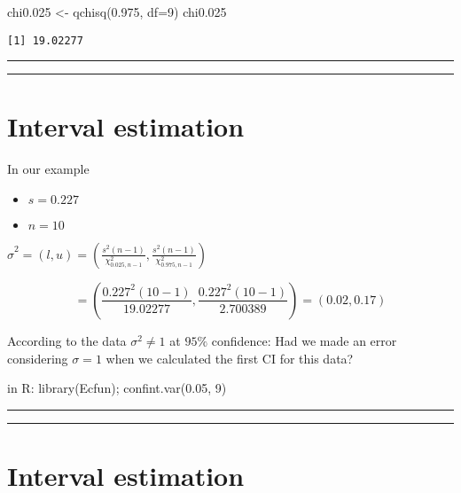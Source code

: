 \documentclass[
]{book}
\newenvironment{Shaded}{\begin{snugshade}}{\end{snugshade}}
\newcommand{\AttributeTok}[1]{\textcolor[rgb]{0.77,0.63,0.00}{#1}}
\newcommand{\DecValTok}[1]{\textcolor[rgb]{0.00,0.00,0.81}{#1}}
\newcommand{\FloatTok}[1]{\textcolor[rgb]{0.00,0.00,0.81}{#1}}
\newcommand{\FunctionTok}[1]{\textcolor[rgb]{0.00,0.00,0.00}{#1}}
\newcommand{\NormalTok}[1]{#1}
\newcommand{\OtherTok}[1]{\textcolor[rgb]{0.56,0.35,0.01}{#1}}
\providecommand{\tightlist}{%
  \setlength{\itemsep}{0pt}\setlength{\parskip}{0pt}}
\begin{document}
\begin{Shaded}
\begin{Highlighting}[]
\NormalTok{chi0}\FloatTok{.025} \OtherTok{\textless{}{-}} \FunctionTok{qchisq}\NormalTok{(}\FloatTok{0.975}\NormalTok{, }\AttributeTok{df=}\DecValTok{9}\NormalTok{)}
\NormalTok{chi0}\FloatTok{.025}
\end{Highlighting}
\end{Shaded}

\begin{verbatim}
[1] 19.02277
\end{verbatim}

\begin{center}\rule{0.5\linewidth}{0.5pt}\end{center}

\begin{center}\rule{0.5\linewidth}{0.5pt}\end{center}

\hypertarget{interval-estimation-9}{%
\section{Interval estimation}\label{interval-estimation-9}}

In our example

\begin{itemize}
\tightlist
\item
  \(s=0.227\)
\item
  \(n=10\)
\end{itemize}

\(\hat{\sigma}^2=(l,u) = (\frac{s^2 (n-1)}{\chi^2_{0.025,n-1}},\frac{s^2(n-1)}{\chi^2_{0.975,n-1}})\)

\[= (\frac{0.227^2 (10-1)}{19.02277},\frac{0.227^2(10-1)}{2.700389})=(0.02,0.17)\]

According to the data \(\sigma^2 \neq 1\) at \(95\%\) confidence: Had we made an error considering \(\sigma=1\) when we calculated the first CI for this data?

in R: library(Ecfun);
confint.var(0.05, 9)

\begin{center}\rule{0.5\linewidth}{0.5pt}\end{center}

\begin{center}\rule{0.5\linewidth}{0.5pt}\end{center}

\hypertarget{interval-estimation-10}{%
\section{Interval estimation}\label{interval-estimation-10}}
\end{document}
